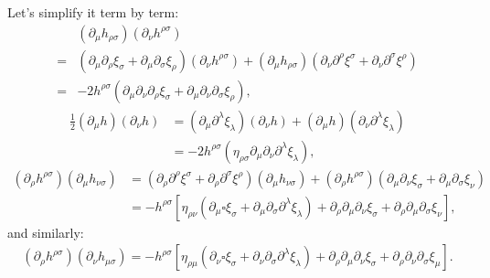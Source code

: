 \documentclass[aps,prd,preprint]{revtex4-1}
\begin{document}
Let's simplify it term by term:
\begin{align}
& \left( \partial_\mu h_{\rho \sigma} \right) \left( \partial_\nu h^{\rho \sigma} \right)\\
= & \left( \partial_\mu \partial_\rho \xi_\sigma + \partial_\mu \partial_\sigma \xi_\rho \right)
    \left( \partial_\nu h^{\rho \sigma} \right) +
  \left( \partial_\mu h_{\rho \sigma} \right) \left( \partial_\nu \partial^\rho \xi^\sigma +
    \partial_\nu \partial^\sigma \xi^\rho \right) \\
= & -2 h^{\rho\sigma} \left( \partial_\mu \partial_\nu \partial_\rho \xi_\sigma +
    \partial_\mu \partial_\nu \partial_\sigma \xi_\rho \right), \label{eq:first-term}
\end{align}
\begin{align}
\frac{1}{2} \left( \partial_\mu h \right) \left( \partial_\nu h \right) & =
  \left( \partial_\mu \partial^\lambda \xi_\lambda \right) \left( \partial_\nu h \right) +
  \left( \partial_\mu h \right) \left( \partial_\nu \partial^\lambda \xi_\lambda \right) \\
& = -2 h^{\rho\sigma} \left( \eta_{\rho\sigma} \partial_\mu \partial_\nu \partial^\lambda \xi_\lambda \right),
  \label{eq:second-term}
\end{align}
\begin{align}
\left( \partial_\rho h^{\rho \sigma} \right) \left( \partial_\mu h_{\nu \sigma} \right) & =
  \left( \partial_\rho \partial^\rho \xi^\sigma + \partial_\rho \partial^\sigma \xi^\rho \right)
    \left( \partial_\mu h_{\nu \sigma} \right) +
  \left( \partial_\rho h^{\rho \sigma} \right) \left( \partial_\mu \partial_\nu \xi_\sigma +
    \partial_\mu \partial_\sigma \xi_\nu \right) \\
& = -h^{\rho \sigma} \left[
  \eta_{\rho \nu} \left( \partial_\mu \square \xi_\sigma +
    \partial_\mu \partial_\sigma \partial^\lambda \xi_\lambda \right) +
    \partial_\rho \partial_\mu \partial_\nu \xi_\sigma +
    \partial_\rho \partial_\mu \partial_\sigma \xi_\nu \right], \label{eq:third-term}
\end{align}
and similarly:
\begin{align}
\left( \partial_\rho h^{\rho \sigma} \right) \left( \partial_\nu h_{\mu \sigma} \right) =
-h^{\rho \sigma} \left[
  \eta_{\rho \mu} \left( \partial_\nu \square \xi_\sigma +
    \partial_\nu \partial_\sigma \partial^\lambda \xi_\lambda \right) +
    \partial_\rho \partial_\mu \partial_\nu \xi_\sigma +
    \partial_\rho \partial_\nu \partial_\sigma \xi_\mu \right]. \label{eq:fourth-term}
\end{align}
\end{document}
